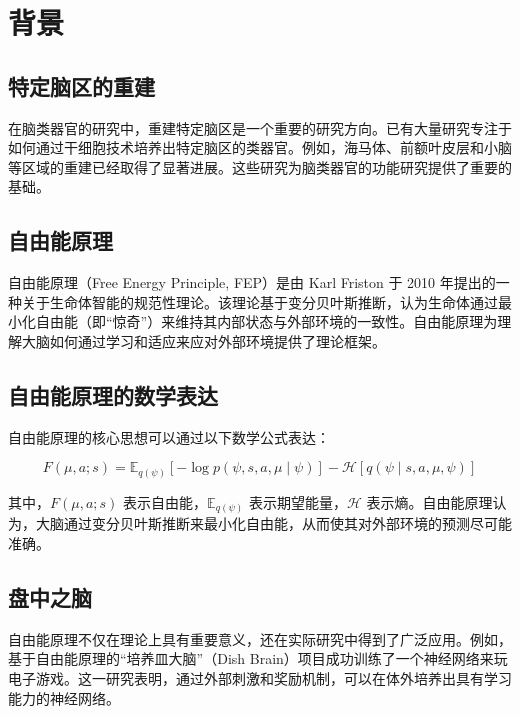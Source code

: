 \chapter{背景}\label{chap:background}

\section{特定脑区的重建}\label{sec:brain-region-reconstruction}
在脑类器官的研究中，重建特定脑区是一个重要的研究方向\cite{Kim2023}。已有大量研究专注于如何通过干细胞技术培养出特定脑区的类器官。例如，海马体、前额叶皮层和小脑等区域的重建已经取得了显著进展。这些研究为脑类器官的功能研究提供了重要的基础。

\section{自由能原理}\label{sec:free-energy-principle}
自由能原理（Free Energy Principle, FEP）是由 Karl Friston 于 2010 年提出的一种关于生命体智能的规范性理论\cite{Friston2010}。该理论基于变分贝叶斯推断，认为生命体通过最小化自由能（即“惊奇”）来维持其内部状态与外部环境的一致性。自由能原理为理解大脑如何通过学习和适应来应对外部环境提供了理论框架。

\section{自由能原理的数学表达}\label{sec:free-energy-math}
自由能原理的核心思想可以通过以下数学公式表达：

\[
F(\mu, a; s) = \mathbb{E}_{q(\psi)} \left[ -\log p(\psi, s, a, \mu \mid \psi) \right] - \mathcal{H}[q(\psi \mid s, a, \mu, \psi)]
\]

其中，$F(\mu, a; s)$ 表示自由能，$\mathbb{E}_{q(\psi)}$ 表示期望能量，$\mathcal{H}$ 表示熵。自由能原理认为，大脑通过变分贝叶斯推断来最小化自由能，从而使其对外部环境的预测尽可能准确。

\section{盘中之脑}\label{sec:dish-brain}
自由能原理不仅在理论上具有重要意义，还在实际研究中得到了广泛应用。例如，基于自由能原理的“培养皿大脑”（Dish Brain）项目成功训练了一个神经网络来玩电子游戏\cite{Kagan2022}。这一研究表明，通过外部刺激和奖励机制，可以在体外培养出具有学习能力的神经网络。

